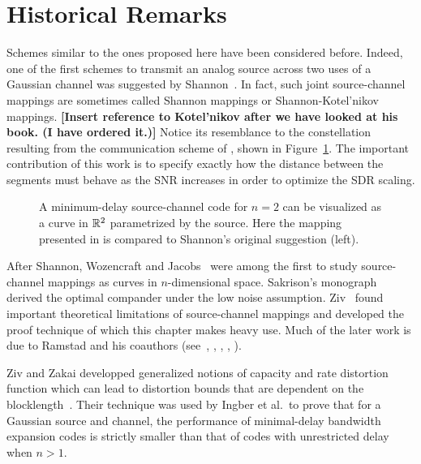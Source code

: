 
\section{Historical Remarks}

Schemes similar to the ones proposed here have been considered before. Indeed,
one of the first schemes to transmit an analog source across two uses of a
Gaussian channel was suggested by Shannon~\cite{Shannon1949}. In fact, such
joint source-channel mappings are sometimes called Shannon mappings  or
Shannon-Kotel'nikov mappings. \textbf{[Insert reference to Kotel'nikov after we
have looked at his book. (I have ordered it.)]} Notice its resemblance to the
constellation resulting from the communication scheme of ,
shown in Figure~\ref{fig:shannoncomparison}. The important contribution of this
work is to specify exactly how the distance between the segments must behave as
the SNR increases in order to optimize the SDR scaling.

\begin{figure}
  \centerline{
  \hfil
  \subfloat[Mapping proposed in \secref{scalarquant}
  (for~$n=2$).]{} }%
  \caption{A minimum-delay source-channel code for $n=2$ can be visualized as a
  curve in $\mathbb{R}^2$ parametrized by the source. Here the mapping
  presented in  is compared to Shannon's original
  suggestion (left).} \label{fig:shannoncomparison}
\end{figure}

After Shannon, Wozencraft and Jacobs~\cite{WozencraftJ1965} were among the first
to study source-channel mappings as curves in $n$-dimensional space. Sakrison's
monograph~\cite{Sakrison1970} derived the optimal compander under the low noise
assumption.  Ziv~\cite{Ziv1970} found important theoretical limitations of
source-channel mappings and developed the proof technique of which this chapter
makes heavy use.  Much of the later work is due to Ramstad and his coauthors
(see~\cite{Ramstad2002}, \cite{FloorR2006}, \cite{CowardR2000,CowardR2000a},
\cite{WernerssonSR2007}, \cite{HeklandFR2009}). 

Ziv and Zakai developped generalized notions of capacity and rate distortion
function which can lead to distortion bounds that are dependent on the
blocklength~\cite{ZivZ1973}. Their technique was used by Ingber et al.\ to 
prove that for a Gaussian source and channel, the performance of minimal-delay
bandwidth expansion codes is strictly smaller than that of codes with
unrestricted delay when $n>1$.

